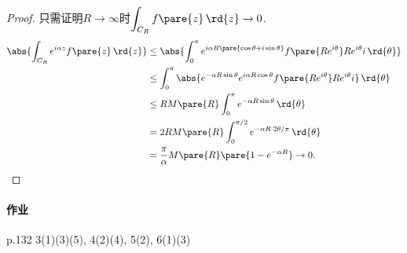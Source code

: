 \documentclass{ctexart}
\begin{document}
\begin{proof}
    只需证明$R\rightarrow\infty$时$\displaystyle \int_{C_R}f\pare{z}\,\rd{z} \rightarrow 0$.
    \begin{align*}
        \abs{\int_{C_R} e^{i\alpha z}f\pare{z}\,\rd{z}} &\le \abs{\int_0^{\pi} e^{i\alpha R\pare{\cos\theta + i\sin\theta}}f\pare{Re^{i\theta}}Re^{i\theta}i\,\rd{\theta}} \\
        &\le \int_0^\pi \abs{e^{-\alpha R\sin\theta} e^{i\alpha R\cos\theta} f\pare{Re^{i\theta}} Re^{i\theta}i}\,\rd{\theta} \\
        &\le RM\pare{R}\int_0^\pi e^{-\alpha R\sin\theta}\,\rd{\theta} \\
        &= 2RM\pare{R} \int_0^{\pi/2} e^{-\alpha R\cdot 2 \theta/\pi}\,\rd{\theta} \\
        &= \frac{\pi}{\alpha}M\pare{R}\pare{1-e^{-\alpha R}} \rightarrow 0. \qedhere
    \end{align*}
\end{proof}

\paragraph{作业} %
\label{par:作业}

p.132 3(1)(3)(5), 4(2)(4), 5(2), 6(1)(3)

\end{document}
